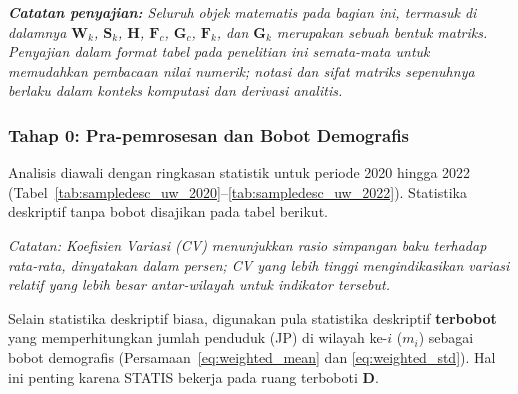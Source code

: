 \vspace{1mm}
\noindent\textit{\textbf{Catatan penyajian:} Seluruh objek matematis pada bagian ini, termasuk di dalamnya $\mathbf{W}_k$, $\mathbf{S}_k$, $\mathbf{H}$, $\mathbf{F}_c$, $\mathbf{G}_c$, $\mathbf{F}_k$, dan $\mathbf{G}_k$ merupakan sebuah bentuk matriks. Penyajian dalam format tabel pada penelitian ini semata-mata untuk memudahkan pembacaan nilai numerik; notasi dan sifat matriks sepenuhnya berlaku dalam konteks komputasi dan derivasi analitis.}

\subsubsection{Tahap 0: Pra-pemrosesan dan Bobot Demografis}
Analisis diawali dengan ringkasan statistik untuk periode 2020 hingga 2022 (Tabel~\ref{tab:sampledesc_uw_2020}--\ref{tab:sampledesc_uw_2022}). Statistika deskriptif tanpa bobot disajikan pada tabel berikut.

\begin{table}[H]
\centering
\caption{Statistika Deskriptif (tanpa Bobot) Tahun 2020} \label{tab:sampledesc_uw_2020}

\end{table}

\begin{table}[H]
\centering
\caption[]{Statistika Deskriptif (tanpa Bobot) Tahun 2021} \label{tab:sampledesc_uw_2021}

\end{table}

\begin{table}[H]
\centering
\caption[]{Statistika Deskriptif (tanpa Bobot) Tahun 2022} \label{tab:sampledesc_uw_2022}

\end{table}

\vspace{2mm}
\noindent\textit{Catatan: Koefisien Variasi (CV) menunjukkan rasio simpangan baku terhadap rata-rata, dinyatakan dalam persen; CV yang lebih tinggi mengindikasikan variasi relatif yang lebih besar antar-wilayah untuk indikator tersebut.}

Selain statistika deskriptif biasa, digunakan pula statistika deskriptif \textbf{terbobot} yang memperhitungkan jumlah penduduk (JP) di wilayah ke-$i$ ($m_i$) sebagai bobot demografis (Persamaan~\ref{eq:weighted_mean} dan \ref{eq:weighted_std}). Hal ini penting karena STATIS bekerja pada ruang terboboti $\mathbf{D}$.


